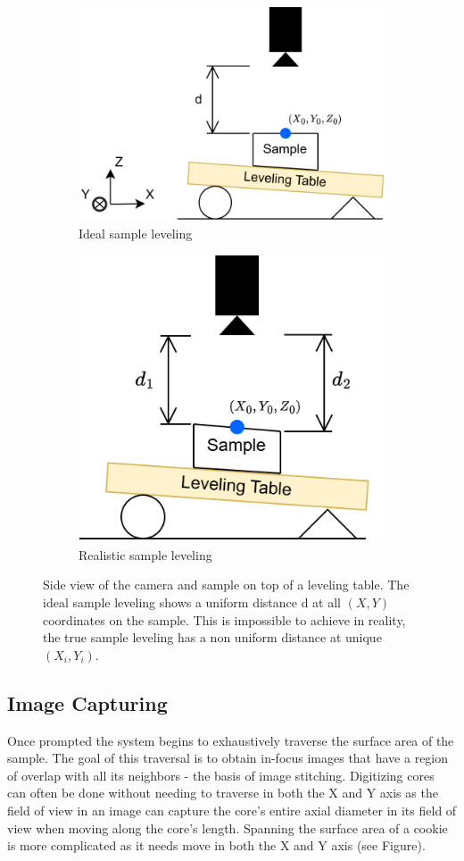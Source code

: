 \documentclass[a4paper,12pt]{article}
\begin{document}
\begin{figure}
    \centering
    \begin{subfigure}{.5\textwidth}
      \centering
      \includegraphics[height=0.5\linewidth]{../diagrams/sample_setup_ideal.png}
      \caption{Ideal sample leveling}
      \label{fig:ideal_levelling}
    \end{subfigure}%
    \begin{subfigure}{.5\textwidth}
      \centering
      \includegraphics[height=0.5\linewidth]{../diagrams/sample_setup_realistic.png}
      \caption{Realistic sample leveling}
      \label{fig:realistic_levelling}
    \end{subfigure}
    \caption{Side view of the camera and sample on top of a leveling table. The ideal sample leveling shows a uniform distance d at all $(X,Y)$ coordinates on the sample. This is impossible to achieve in reality, the true sample leveling has a non uniform distance at unique $(X_i, Y_i)$.}
    \label{fig:sample_levelling}
\end{figure}


\subsection{Image Capturing}
Once prompted the system begins to exhaustively traverse the surface area of the sample. 
The goal of this traversal is to obtain in-focus images that have a region of overlap with all its neighbors - the basis of image stitching. 
Digitizing cores can often be done without needing to traverse in both the X and Y axis as the field of view in an image can capture the core's entire axial diameter in its field of view when moving along the core's length. %
Spanning the surface area of a cookie is more complicated as it needs move in both the X and Y axis (see Figure).
\end{document}

